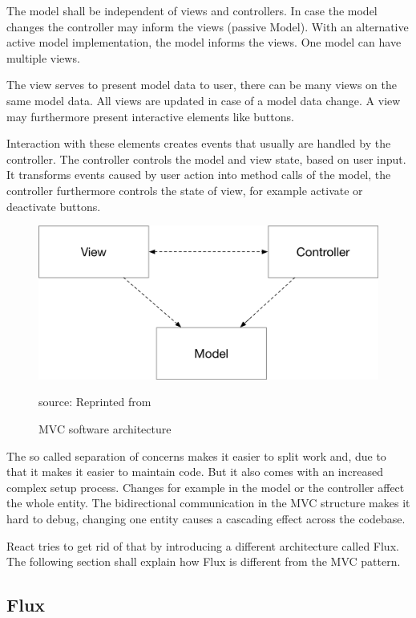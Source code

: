 The model shall be independent of views and controllers. In case the model changes the controller may inform the views (passive Model). With an alternative active model implementation, the model informs the views. One model can have multiple views.
 
The view serves to present model data to user, there can be many views on the same model data. All views are updated in case of a model data change. A view may furthermore present interactive elements like buttons. 
 
Interaction with these elements creates events that usually are handled by the controller. The controller controls the model and view state, based on user input. It transforms events caused by user action into method calls of the model, the controller furthermore controls the state of view, for example activate or deactivate buttons. \cite{GOLL}


\begin{figure}[H]
	\centering
	\includegraphics[width=0.8\linewidth]{bilder/grundlagen/MVC.png}
	\caption{MVC  software architecture} source: Reprinted from \cite{GOLL}
	\label{fig:MVC}
\end{figure}


The so called separation of concerns makes it easier to split work and, due to that it makes it easier to maintain code. But it also comes with an increased complex setup process. Changes for example in the model or the controller affect the whole entity. The bidirectional communication in the MVC structure makes it hard to debug, changing one entity  causes a cascading effect across the codebase.

React tries to get rid of that by introducing a different architecture called Flux. The following section shall explain how Flux is different from the MVC pattern.

\subsection{Flux}

